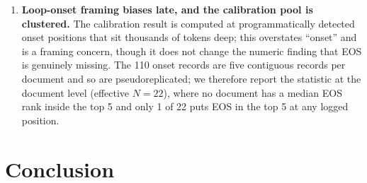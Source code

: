\documentclass[11pt]{article}
\begin{document}
\begin{enumerate}
  \item \textbf{Loop-onset framing biases late, and the calibration pool is clustered.} The
  calibration result is computed at programmatically detected onset positions that sit
  thousands of tokens deep; this overstates ``onset'' and is a framing concern, though it
  does not change the numeric finding that EOS is genuinely missing. The 110 onset records
  are five contiguous records per document and so are pseudoreplicated; we therefore report
  the statistic at the document level (effective $N=22$), where no document has a median
  EOS rank inside the top 5 and only 1 of 22 puts EOS in the top 5 at any logged position.
\end{enumerate}

\section{Conclusion}
\label{sec:conclusion}
\end{document}
